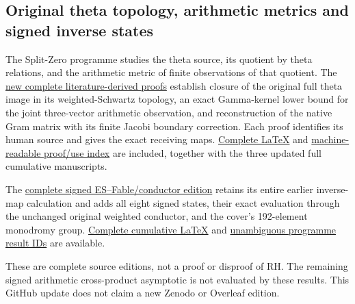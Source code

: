 \documentclass[
]{article}
\begin{document}
\subsection{Original theta topology, arithmetic metrics and signed
inverse
states}\label{original-theta-topology-arithmetic-metrics-and-signed-inverse-states}

The Split-Zero programme studies the theta source, its quotient by theta
relations, and the arithmetic metric of finite observations of that
quotient. The
\href{https://github.com/KokunoYumeto/zeta-function-research-reader/blob/main/workbenches/splitzero-tandem/continuations/20260920-original-theta-arithmetic-observation/README.md}{new
complete literature-derived proofs} establish closure of the original
full theta image in its weighted-Schwartz topology, an exact
Gamma-kernel lower bound for the joint three-vector arithmetic
observation, and reconstruction of the native Gram matrix with its
finite Jacobi boundary correction. Each proof identifies its human
source and gives the exact receiving maps.
\href{https://github.com/KokunoYumeto/zeta-function-research-reader/blob/main/workbenches/splitzero-tandem/continuations/20260920-original-theta-arithmetic-observation/LITERATURE_RECEIVERS_COMPLETE.tex}{Complete
LaTeX} and
\href{https://github.com/KokunoYumeto/zeta-function-research-reader/blob/main/workbenches/splitzero-tandem/continuations/20260920-original-theta-arithmetic-observation/RESULT_INDEX.json}{machine-readable
proof/use index} are included, together with the three updated full
cumulative manuscripts.

The
\href{https://github.com/KokunoYumeto/zeta-function-research-reader/blob/main/workbenches/splitzero-tandem/continuations/20260920-fable-signed-states/README.md}{complete
signed ES--Fable/conductor edition} retains its entire earlier
inverse-map calculation and adds all eight signed states, their exact
evaluation through the unchanged original weighted conductor, and the
cover's 192-element monodromy group.
\href{https://github.com/KokunoYumeto/zeta-function-research-reader/blob/main/workbenches/splitzero-tandem/continuations/20260920-fable-signed-states/FABLE_TO_ORIGINAL_CONDUCTOR.tex}{Complete
cumulative LaTeX} and
\href{https://github.com/KokunoYumeto/zeta-function-research-reader/blob/main/workbenches/splitzero-tandem/continuations/20260920-fable-signed-states/PROGRAMME_ALIASES.md}{unambiguous
programme result IDs} are available.

These are complete source editions, not a proof or disproof of RH. The
remaining signed arithmetic cross-product asymptotic is not evaluated by
these results. This GitHub update does not claim a new Zenodo or
Overleaf edition.
\end{document}

